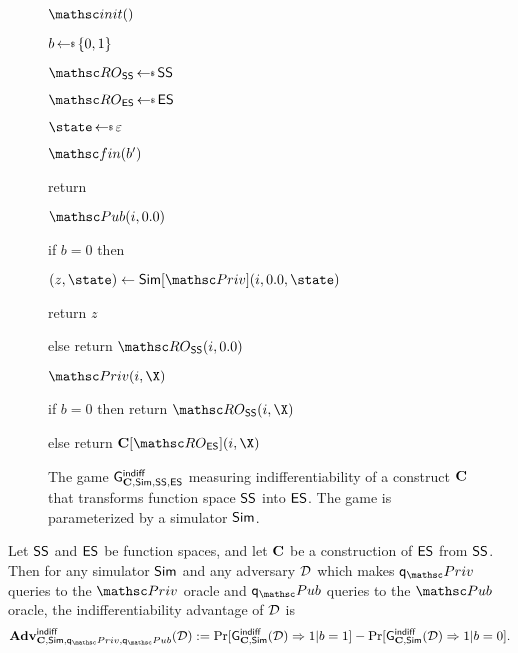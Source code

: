 \begin{figure}[tp]
	\centering
	\begin{minipage}[t]{0.3\textwidth}
		
		\begin{oracle}{$\Initialize()$}
			\item $b \getsr \bits$
			\item $\RO_{\SSp} \getsr \SSp$
			\item $\RO_{\ESp} \getsr \ESp$
			\item $\state \getsr \emptystring$
		\end{oracle}
		
		\ExptSepSpace
		
		\begin{oracle}{$\Finalize(b')$}
			\item return 
		\end{oracle}
	\end{minipage}
	\begin{minipage}[t]{0.49\textwidth}
		\ExptSepSpace
		
		\begin{oracle}{$\PubO(i,\Y)$}
			\item if $b = 0$ then
			\item \quad  $(z,\state) \gets \simulator[\PrivO](i,\Y,\state)$
			\item \quad return $z$
			\item else return $\RO_{\SSp}(i,\Y)$
		\end{oracle}
		
		\ExptSepSpace
		
		\begin{oracle}{$\PrivO(i,\X)$}
			\item if $b = 0$ then return $\RO_{\SSp}(i,\X)$
			\item else return $\construct{C}[\RO_{\ESp}](i, \X)$
		\end{oracle}
	\end{minipage}
	\vspace{5pt}
	\caption{The game  $\mathsf{G}^{\mathsf{indiff}}_{\mathbf{C}, \mathsf{Sim}, \mathsf{SS}, \mathsf{ES}}$ measuring indifferentiability of a construct $\mathbf{C}$ that transforms function space $\mathsf{SS}$ into $\mathsf{ES}$. The game is parameterized by a simulator $\mathsf{Sim}$.}
	\label{fig:game-indiff}
\end{figure}


\begin{definition}[Indifferentiability]
	Let $\mathsf{SS}$ and $\mathsf{ES}$ be function spaces, and let $\mathbf{C}$ be a construction of $\mathsf{ES}$ from $\mathsf{SS}$. Then for any simulator $\mathsf{Sim}$ and any adversary $\mathcal{D}$ which makes $\qPriv$ queries to the $\PrivO$ oracle and $\qPub$ queries to the $\PubO$ oracle, the indifferentiability advantage of $\mathcal{D}$ is
	\[\genAdv{\indiff}{\construct{C},\simulator, \qPriv, \qPub}{\advD} := \Pr[\Gindiff_{\construct{C}, \simulator}(\advD) \Rightarrow 1 | b = 1] -\Pr[\Gindiff_{\construct{C}, \simulator}(\advD) \Rightarrow 1 | b = 0].\]
\end{definition}


